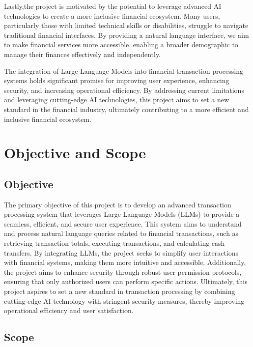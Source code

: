 \noindent Lastly,the project is motivated by the potential to leverage advanced AI technologies to create a more inclusive financial ecosystem. Many users, particularly those with limited technical skills or disabilities, struggle to navigate traditional financial interfaces. By providing a natural language interface, we aim to make financial services more accessible, enabling a broader demographic to manage their finances effectively and independently.

\noindent The integration of Large Language Models into financial transaction processing systems holds significant promise for improving user experience, enhancing security, and increasing operational efficiency. By addressing current limitations and leveraging cutting-edge AI technologies, this project aims to set a new standard in the financial industry, ultimately contributing to a more efficient and inclusive financial ecosystem.

\clearpage

\section{Objective and Scope}

\subsection{Objective}

The primary objective of this project is to develop an advanced transaction processing system that leverages Large Language Models (LLMs) to provide a seamless, efficient, and secure user experience. This system aims to understand and process natural language queries related to financial transactions, such as retrieving transaction totals, executing transactions, and calculating cash transfers. By integrating LLMs, the project seeks to simplify user interactions with financial systems, making them more intuitive and accessible. Additionally, the project aims to enhance security through robust user permission protocols, ensuring that only authorized users can perform specific actions. Ultimately, this project aspires to set a new standard in transaction processing by combining cutting-edge AI technology with stringent security measures, thereby improving operational efficiency and user satisfaction.

\subsection{Scope}

